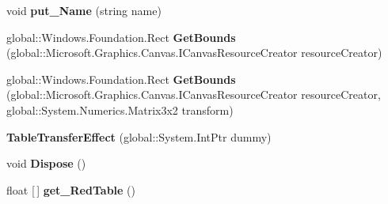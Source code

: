 \begin{DoxyCompactItemize}
\mbox{\label{class_microsoft_1_1_graphics_1_1_canvas_1_1_effects_1_1_table_transfer_effect_ab3ddf2e399cb1acbd782f786aaacc579}} 
void {\bfseries put\+\_\+\+Name} (string name)
\item 
\mbox{\label{class_microsoft_1_1_graphics_1_1_canvas_1_1_effects_1_1_table_transfer_effect_a1837f2092a2f7df44f26878cf6531baa}} 
global\+::\+Windows.\+Foundation.\+Rect {\bfseries Get\+Bounds} (global\+::\+Microsoft.\+Graphics.\+Canvas.\+I\+Canvas\+Resource\+Creator resource\+Creator)
\item 
\mbox{\label{class_microsoft_1_1_graphics_1_1_canvas_1_1_effects_1_1_table_transfer_effect_a5a75b3c4d1c9d7dc01364dfbe795eb03}} 
global\+::\+Windows.\+Foundation.\+Rect {\bfseries Get\+Bounds} (global\+::\+Microsoft.\+Graphics.\+Canvas.\+I\+Canvas\+Resource\+Creator resource\+Creator, global\+::\+System.\+Numerics.\+Matrix3x2 transform)
\item 
\mbox{\label{class_microsoft_1_1_graphics_1_1_canvas_1_1_effects_1_1_table_transfer_effect_a00f1866e148048c12db7d9cd6835a5c6}} 
{\bfseries Table\+Transfer\+Effect} (global\+::\+System.\+Int\+Ptr dummy)
\item 
\mbox{\label{class_microsoft_1_1_graphics_1_1_canvas_1_1_effects_1_1_table_transfer_effect_a34a02a0b9d09bae4a46a7fa153f37403}} 
void {\bfseries Dispose} ()
\item 
\mbox{\label{class_microsoft_1_1_graphics_1_1_canvas_1_1_effects_1_1_table_transfer_effect_acc0161603fda92199b24a968798dd935}} 
float \mbox{[}$\,$\mbox{]} {\bfseries get\+\_\+\+Red\+Table} ()
\item 
\mbox{\label{class_microsoft_1_1_graphics_1_1_canvas_1_1_effects_1_1_table_transfer_effect_afb6831c07f2eeaf7bd02cb8e5564b76b}} 

\end{DoxyCompactItemize}
